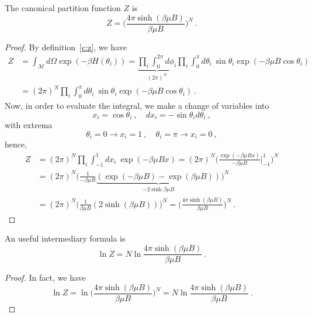     The canonical partition function $Z$ is 
    \begin{equation*}
        Z = \Big (\frac{4 \pi \sinh (\beta \mu B)}{\beta \mu B} \Big )^N ~.
    \end{equation*}
    \begin{proof}
        By definition~\eqref{c:z}, we have
        \begin{equation*}
        \begin{aligned}
            Z & = \int_{\mathcal M} d \Omega \exp(- \beta H (\theta_i)) = \underbrace{\prod_i \int_0^{2\pi} d\phi_i}_{(2\pi)^N} \prod_i \int_0^\pi d\theta_i ~ \sin \theta_i \exp(- \beta \mu B \cos \theta_i) \\ & = (2\pi)^N \prod_i \int_0^\pi d\theta_i ~ \sin \theta_i \exp(- \beta \mu B \cos \theta_i)  ~.
        \end{aligned}
        \end{equation*}
        Now, in order to evaluate the integral, we make a change of variables into
        \begin{equation*}
            x_i  = \cos \theta_i ~, \quad d x_i = - \sin \theta_i d\theta_i ~,
        \end{equation*}
        with extrema 
        \begin{equation*}
            \theta_i = 0 \rightarrow x_i = 1 ~, \quad \theta_i = \pi \rightarrow x_i = 0 ~,
        \end{equation*}
        hence,
        \begin{equation*}
        \begin{aligned}
            Z & = (2\pi)^N \prod_i \int_{-1}^1 dx_i ~ \exp(- \beta \mu B x) = (2\pi)^N \Big ( \frac{\exp(- \beta \mu B x)}{- \beta \mu B} \Big \vert_{-1}^{1} \Big )^N \\ & = (2\pi)^N \Big ( \frac{1}{- \beta \mu B} \underbrace{(\exp(- \beta \mu B) - \exp(\beta \mu B))}_{- 2 \sinh \beta \mu B}\Big )^N \\ & = (2\pi)^N \Big ( \frac{1}{\beta \mu B} (2 \sinh (\beta \mu B)) \Big )^N = \Big (\frac{4 \pi \sinh (\beta \mu B)}{\beta \mu B} \Big )^N ~.
        \end{aligned}
        \end{equation*}
    \end{proof}

    An useful intermediary formula is 
    \begin{equation*}
        \ln Z = N \ln \frac{4 \pi \sinh (\beta \mu B)}{\beta \mu B}  ~.
    \end{equation*}
    \begin{proof}
        In fact, we have
        \begin{equation*}
            \ln Z = \ln \Big (\frac{4 \pi \sinh (\beta \mu B)}{\beta \mu B} \Big )^N = N \ln \frac{4 \pi \sinh (\beta \mu B)}{\beta \mu B}  ~.
        \end{equation*}
    \end{proof}
    
